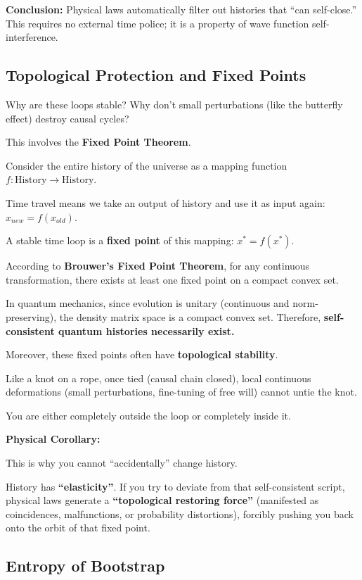 \textbf{Conclusion:} Physical laws automatically filter out histories that ``can self-close.'' This requires no external time police; it is a property of wave function self-interference.

\subsection{Topological Protection and Fixed Points}

Why are these loops stable? Why don't small perturbations (like the butterfly effect) destroy causal cycles?

This involves the \textbf{Fixed Point Theorem}.

Consider the entire history of the universe as a mapping function $f: \text{History} \to \text{History}$.

Time travel means we take an output of history and use it as input again: $x_{new} = f(x_{old})$.

A stable time loop is a \textbf{fixed point} of this mapping: $x^* = f(x^*)$.

According to \textbf{Brouwer's Fixed Point Theorem}, for any continuous transformation, there exists at least one fixed point on a compact convex set.

In quantum mechanics, since evolution is unitary (continuous and norm-preserving), the density matrix space is a compact convex set. Therefore, \textbf{self-consistent quantum histories necessarily exist.}

Moreover, these fixed points often have \textbf{topological stability}.

Like a knot on a rope, once tied (causal chain closed), local continuous deformations (small perturbations, fine-tuning of free will) cannot untie the knot.

You are either completely outside the loop or completely inside it.

\textbf{Physical Corollary:}

This is why you cannot ``accidentally'' change history.

History has \textbf{``elasticity''}. If you try to deviate from that self-consistent script, physical laws generate a \textbf{``topological restoring force''} (manifested as coincidences, malfunctions, or probability distortions), forcibly pushing you back onto the orbit of that fixed point.

\subsection{Entropy of Bootstrap}

